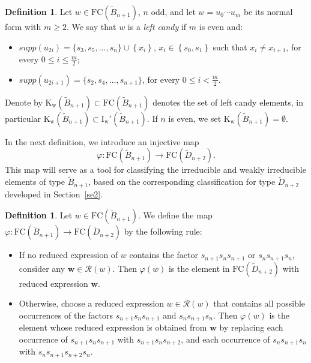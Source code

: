 \documentclass{amsart}
\newcommand{\D}{{\widetilde{D}_{n+2}}}
\newcommand{\B}{{\widetilde{B}_{n+1}}}
\newcommand{\fc}{{\mathrm{FC}}}
\newcommand{\carw}{\mathrm{K_w}}
\newcommand{\IRc}{\mathrm{I_w'}}
\newcommand{\nmap}{\varphi}
\theoremstyle{definition}
\newtheorem{Definition}[Theorem]{Definition}
\begin{document}
\begin{Definition}
\label{weakcandy}
Let $ w \in \fc(\B) $, $ n $ odd, and let $ w = u_0 \cdots u_m $ be its normal form with $ m \ge 2 $. We say that $ w $ is a \textit{left candy} if $ m $ is even and:
\begin{itemize}
    \item $ supp(u_{2i}) = \{s_3, s_5, \ldots, s_n\} \cup \left\{ x_i\right\} $, $ x_i \in \left\{s_0, s_1 \right\} $ such that $ x_i \neq x_{i+1} $, for every $ 0 \le i \le \frac{m}{2} $;
    \item $ supp(u_{2i+1}) = \{s_2, s_4, \ldots, s_{n+1}\} $, for every $ 0 \le i < \frac{m}{2} $.
\end{itemize}
Denote by $ \carw (\B) \subset \fc(\B) $ denotes the set of left candy elements, in particular $\carw(\B) \subset \IRc(\B) $. If $n$ is even, we set $\carw(\B)=\emptyset$.
\end{Definition}



In the next definition, we introduce an injective map
$$\nmap:\fc(\B) \rightarrow \fc(\D).$$
This map will serve as a tool for classifying the irreducible and weakly irreducible elements of type $\B$, based on the corresponding classification for type $\D$ developed in Section~\ref{se2}.

\begin{Definition}\label{def:mu}   
Let $w \in \fc(\B)$. We define the map $\nmap:\fc(\B) \rightarrow \fc(\D)$ by the following rule:


\begin{itemize}

\item[(1)] If no reduced expression of $w$ contains the factor $s_{n+1}s_{n}s_{n+1}$ or $s_{n}s_{n+1}s_{n}$, consider any $\mathbf{w} \in \mathcal{R}(w)$. Then $\nmap(w)$ is the element in $\fc(\D)$ with reduced expression $\mathbf{w}$.

\item[(2)] Otherwise, choose a reduced expression
$w \in \mathcal{R}(w)$ that contains all possible occurrences of the factors $s_{n+1}s_ns_{n+1}$ and $s_ns_{n+1}s_n$. Then $\nmap(w)$ is the element whose reduced expression is obtained from $\mathbf{w}$ by replacing each occurrence of $s_{n+1}s_ns_{n+1}$ with $s_{n+1}s_ns_{n+2}$, and each occurrence of $s_ns_{n+1}s_n$ with $s_ns_{n+1}s_{n+2}s_n$.

\end{itemize}

\end{Definition} 
\end{document}
